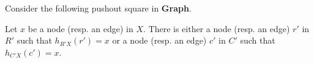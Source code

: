 \begin{lemma}
    \label{lem:xinXcpinCrpinR}
        Consider the following pushout square in \textbf{Graph}.
    \begin{center}
    \end{center} 
     Let $x$ be a node (resp. an edge) in $X$. There is either a node (resp. an edge) $r'$ in $R'$ such that $h_{R'X}(r') \mathop{=} x$ or a node (resp. an edge) $c'$ in $C'$ such that $h_{C'X}(c') \mathop{=} x$.
\end{lemma}
